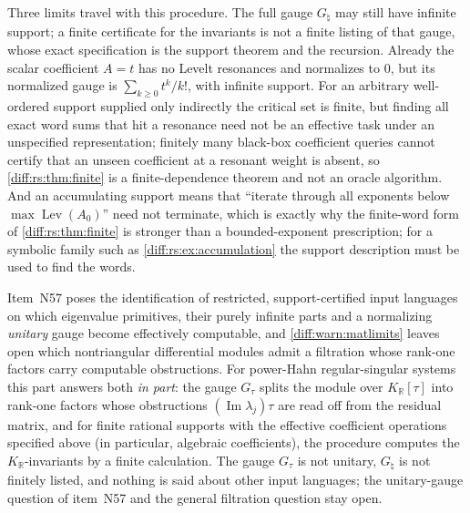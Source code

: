 \documentclass[11pt,letterpaper]{article}
\numberwithin{equation}{section}
\theoremstyle{definition}
\theoremstyle{remark}
\newcommand{\R}{\mathbb R}
\newcommand{\Imm}{\operatorname{Im}}
\newcommand{\KR}{K_{\R}}
\newcommand{\Lev}{\operatorname{Lev}}
\begin{document}
Three limits travel with this procedure. The full gauge $G_{\natural}$ may still
have infinite support; a finite certificate for the invariants is not a finite
listing of that gauge, whose exact specification is the support theorem and the
recursion. Already the scalar coefficient $A=t$ has no Levelt
resonances and normalizes to $0$, but its normalized gauge is
$\sum_{k\geq0}t^k/k!$, with infinite support.
For an arbitrary well-ordered support supplied only indirectly the
critical set is finite, but finding all exact word sums that hit a resonance
need not be an effective task under an unspecified representation; finitely
many black-box coefficient queries cannot certify that an unseen coefficient at
a resonant weight is absent, so \cref{diff:rs:thm:finite} is a finite-dependence
theorem and not an oracle algorithm. And an accumulating support means that
``iterate through all exponents below $\max\Lev(A_{0})$'' need not terminate,
which is exactly why the finite-word form of \cref{diff:rs:thm:finite} is
stronger than a bounded-exponent prescription; for a symbolic family such as
\cref{diff:rs:ex:accumulation} the support description must be used to find the
words.

\begin{remark}
\label{diff:rs:rem:effective}
Item~N57 poses the identification of restricted, support-certified input
languages on which eigenvalue primitives, their purely infinite parts and a
normalizing \emph{unitary} gauge become effectively computable, and
\cref{diff:warn:matlimits} leaves open which nontriangular differential modules
admit a filtration whose rank-one factors carry computable obstructions. For
power-Hahn regular-singular systems this part answers both \emph{in part}: the
gauge $G_{\tau}$ splits the module over $\KR[\tau]$ into rank-one factors whose
obstructions $(\Imm\lambda_{j})\tau$ are read off from the residual matrix, and
for finite rational supports with the effective coefficient operations
specified above (in particular, algebraic coefficients), the procedure
computes the $\KR$-invariants by a finite calculation. The gauge $G_{\tau}$ is not
unitary, $G_{\natural}$ is not finitely listed, and nothing is said about other
input languages; the unitary-gauge question of item~N57 and the general
filtration question stay open.
\end{remark}
\end{document}
